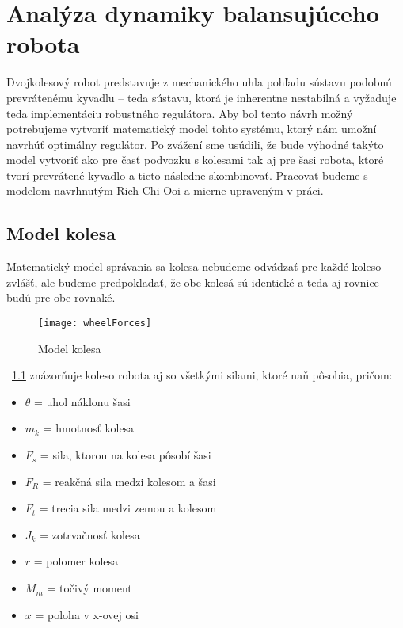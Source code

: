 \chapter{Analýza dynamiky balansujúceho robota}
\label{ch:analyza}

Dvojkolesový robot predstavuje z mechanického uhla pohľadu sústavu podobnú prevrátenému kyvadlu – teda sústavu, ktorá je inherentne nestabilná a vyžaduje teda implementáciu robustného regulátora. Aby bol tento návrh možný potrebujeme vytvoriť matematický model tohto systému, ktorý nám umožní navrhúť optimálny regulátor. Po zvážení sme usúdili, že bude výhodné takýto model vytvoriť ako pre časť podvozku s kolesami tak aj pre šasi robota, ktoré tvorí prevrátené kyvadlo a tieto následne skombinovať.
Pracovať budeme s modelom navrhnutým Rich Chi Ooi \cite{Oochi2003} a mierne upraveným v práci\cite{TWIP}.

\section{Model kolesa}

Matematický model správania sa kolesa nebudeme odvádzať pre každé koleso zvlášť, ale budeme predpokladať, že obe kolesá sú identické a teda aj rovnice budú pre obe rovnaké.
\begin{figure}
\centering
\texttt{[image: wheelForces]}
\caption{Model kolesa}
\label{fig:wheelForces}
\end{figure}

\figurename~\ref{fig:wheelForces} znázorňuje koleso robota aj so všetkými silami, ktoré naň pôsobia, pričom:

\begin{multicols}{2}
\begin{itemize}
\item $\theta$ = uhol náklonu šasi
\item $m_k$ = hmotnosť kolesa 
\item $F_s$ = sila, ktorou na kolesa pôsobí šasi
\item $F_R$ = reakčná sila medzi kolesom a šasi
\item $F_t$ = trecia sila medzi zemou a kolesom
\item $J_k$ = zotrvačnosť kolesa
\item $r$ = polomer kolesa 
\item $M_m$ = točivý moment
\item $x$ = poloha v x-ovej osi
\end{itemize}
\end{multicols}

